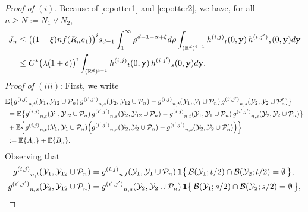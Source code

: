 \documentclass[11pt]{amsart}
\numberwithin{equation}{section}
\theoremstyle{plain}
\theoremstyle{definition}
\begin{document}
\begin{proof}[Proof of $(i)$]
Because of \eqref{e:potter1} and \eqref{e:potter2}, we have, for all $n \geq N := N_1 \vee N_2$,
\begin{align*}
J_n &\leq \bigl(  (1+\xi) nf(R_ne_1) \bigr)^i s_{d-1} \int_1^\infty \rho^{d-1-\alpha+\xi} d\rho \int_{({{\mathbb R}}^d)^{i-1}} {h^{(i,j)}}_t(0,{{\bf y}})\, {h^{(i,{j^{\prime}})}}_s(0,{{\bf y}}) d{{\bf y}} \\
&\leq C^* \bigl( \lambda (1+\delta) \bigr)^i \int_{({{\mathbb R}}^d)^{i-1}} {h^{(i,j)}}_t(0,{{\bf y}})\, {h^{(i,{j^{\prime}})}}_s(0,{{\bf y}}) d{{\bf y}}.
\end{align*}
\textit{Proof of $(iii)$}:
First, we write
\begin{align*}
&{\mathbb{E}} \bigl\{  {g^{(i,j)}}_{n,t}({{\mathcal{Y}}}_1, {{\mathcal{Y}}}_{12} \cup {\mathcal P_n})\, {g^{(i^{\prime},j^{\prime})}}_{n,s}({{\mathcal{Y}}}_2, {{\mathcal{Y}}}_{12} \cup {\mathcal P_n}) - {g^{(i,j)}}_{n,t}({{\mathcal{Y}}}_1, {{\mathcal{Y}}}_1 \cup {\mathcal P_n})\, {g^{(i^{\prime},j^{\prime})}}_{n,s} ({{\mathcal{Y}}}_2, {{\mathcal{Y}}}_2 \cup {\mathcal P_n^{\prime}})\bigr\} \\
&\ = {\mathbb{E}} \bigl\{  {g^{(i,j)}}_{n,t}({{\mathcal{Y}}}_1, {{\mathcal{Y}}}_{12} \cup {\mathcal P_n})\, {g^{(i^{\prime},j^{\prime})}}_{n,s}({{\mathcal{Y}}}_2, {{\mathcal{Y}}}_{12} \cup {\mathcal P_n}) - {g^{(i,j)}}_{n,t}({{\mathcal{Y}}}_1, {{\mathcal{Y}}}_1 \cup {\mathcal P_n})\, {g^{(i^{\prime},j^{\prime})}}_{n,s} ({{\mathcal{Y}}}_2, {{\mathcal{Y}}}_2 \cup {\mathcal P_n})\bigr\} \\
&\ + {\mathbb{E}} \Bigl\{ {g^{(i,j)}}_{n,t}({{\mathcal{Y}}}_1, {{\mathcal{Y}}}_1 \cup {\mathcal P_n}) \Bigl( {g^{(i^{\prime},j^{\prime})}}_{n,s}({{\mathcal{Y}}}_2, {{\mathcal{Y}}}_2 \cup {\mathcal P_n}) - {g^{(i^{\prime},j^{\prime})}}_{n,s}({{\mathcal{Y}}}_2, {{\mathcal{Y}}}_2 \cup {\mathcal P_n^{\prime}}) \Bigr) \Bigr\} \\
&\ := {\mathbb{E}} \{ A_n \} + {\mathbb{E}} \{ B_n \}.
\end{align*}
Observing that
\begin{align*}
{g^{(i,j)}}_{n,t}({{\mathcal{Y}}}_1, {{\mathcal{Y}}}_{12} \cup {\mathcal P_n}) &= {g^{(i,j)}}_{n,t}({{\mathcal{Y}}}_1, {{\mathcal{Y}}}_1 \cup {\mathcal P_n})\, {{\bf 1}} \bigl\{  \, {\mathcal B} ({{\mathcal{Y}}}_1; t/2) \cap {\mathcal B}({{\mathcal{Y}}}_2; t/2) = \emptyset \, \bigr\}, \\
{g^{(i^{\prime},j^{\prime})}}_{n,s}({{\mathcal{Y}}}_2, {{\mathcal{Y}}}_{12} \cup {\mathcal P_n}) &= {g^{(i^{\prime},j^{\prime})}}_{n,s}({{\mathcal{Y}}}_2, {{\mathcal{Y}}}_2 \cup {\mathcal P_n})\, {{\bf 1}} \bigl\{  \, {\mathcal B} ({{\mathcal{Y}}}_1; s/2) \cap {\mathcal B}({{\mathcal{Y}}}_2; s/2) = \emptyset \, \bigr\},

\end{align*}
\end{proof}
\end{document}
